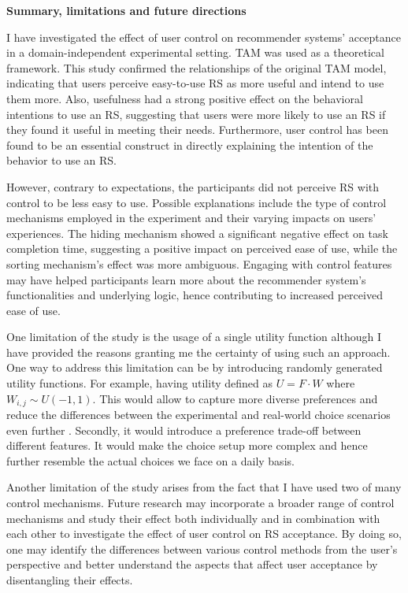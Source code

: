 \documentclass[a4paper,12pt]{article}
\begin{document}
\textbf{Summary, limitations and future directions}

I have investigated the effect of user control on recommender systems' acceptance in a domain-independent experimental setting. TAM was used as a theoretical framework. This study confirmed the relationships of the original TAM model, indicating that users perceive easy-to-use RS as more useful and intend to use them more. Also, usefulness had a strong positive effect on the behavioral intentions to use an RS, suggesting that users were more likely to use an RS if they found it useful in meeting their needs. Furthermore, user control has been found to be an essential construct in directly explaining the intention of the behavior to use an RS.

However, contrary to expectations, the participants did not perceive RS with control to be less easy to use. Possible explanations include the type of control mechanisms employed in the experiment and their varying impacts on users' experiences. The hiding mechanism showed a significant negative effect on task completion time, suggesting a positive impact on perceived ease of use, while the sorting mechanism's effect was more ambiguous. Engaging with control features may have helped participants learn more about the recommender system's functionalities and underlying logic, hence contributing to increased perceived ease of use.

One limitation of the study is the usage of a single utility function although I have provided the reasons granting me the certainty of using such an approach. One way to address this limitation can be by introducing randomly generated utility functions. For example, having utility defined as $U = F \cdot W$ where $W_{i,j} \sim U(-1,1)$. This would allow to capture more diverse preferences and reduce the differences between the experimental and real-world choice scenarios even further \citep{vesanen2007personalization}. Secondly, it would introduce a preference trade-off between different features. It would make the choice setup more complex and hence further resemble the actual choices we face on a daily basis.

Another limitation of the study arises from the fact that I have used two of many control mechanisms. Future research may incorporate a broader range of control mechanisms and study their effect both individually and in combination with each other to investigate the effect of user control on RS acceptance. By doing so, one may identify the differences between various control methods from the user's perspective and better understand the aspects that affect user acceptance by disentangling their effects. 
\end{document}

